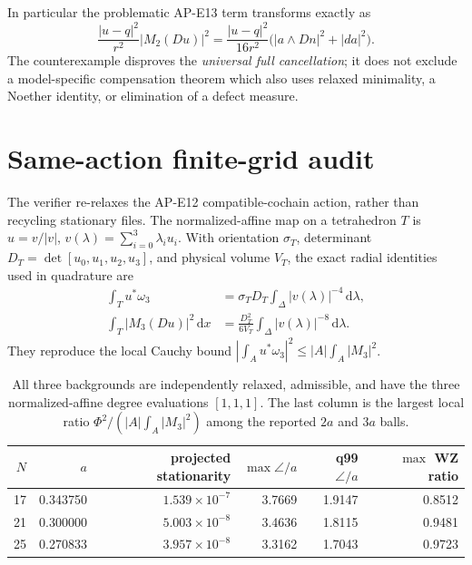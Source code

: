 \documentclass[11pt]{article}
\newcommand{\dd}{\,\mathrm d}
\begin{document}
In particular the problematic AP-E13 term transforms exactly as
\begin{equation}
 \frac{|u-q|^2}{r^2}|M_2(Du)|^2
 =\frac{|u-q|^2}{16r^2}
   \bigl(|a\wedge Dn|^2+|da|^2\bigr).                 \label{eq:remainder}
\end{equation}
The counterexample disproves the \emph{universal full cancellation}; it does
not exclude a model-specific compensation theorem which also uses relaxed
minimality, a Noether identity, or elimination of a defect measure.

\section{Same-action finite-grid audit}

The verifier re-relaxes the AP-E12 compatible-cochain action, rather than
recycling stationary files.  The normalized-affine map on a tetrahedron $T$
is $u=v/|v|$, $v(\lambda)=\sum_{i=0}^3\lambda_i u_i$.  With orientation
$\sigma_T$, determinant $D_T=\det[u_0,u_1,u_2,u_3]$, and physical volume
$V_T$, the exact radial identities used in quadrature are
\begin{align}
 \int_Tu^*\omega_3
 &=\sigma_TD_T\int_\Delta|v(\lambda)|^{-4}\dd\lambda, \label{eq:tetwz}\\
 \int_T|M_3(Du)|^2\dd x
 &=\frac{D_T^2}{6V_T}\int_\Delta|v(\lambda)|^{-8}\dd\lambda. \label{eq:tetm3}
\end{align}
They reproduce the local Cauchy bound
$|\int_Au^*\omega_3|^2\leq |A|\int_A|M_3|^2$.

\begin{table}[ht]
\centering
\small
\begin{tabular}{@{}rrrrrr@{}}
\toprule
$N$ & $a$ & projected stationarity & $\max\angle/a$ & q99 $\angle/a$
& $\max$ WZ ratio\\
\midrule
17 & 0.343750 & $1.539\times10^{-7}$ & 3.7669 & 1.9147 & 0.8512\\
21 & 0.300000 & $5.003\times10^{-8}$ & 3.4636 & 1.8115 & 0.9481\\
25 & 0.270833 & $3.957\times10^{-8}$ & 3.3162 & 1.7043 & 0.9723\\
\bottomrule
\end{tabular}
\caption{All three backgrounds are independently relaxed, admissible, and
have the three normalized-affine degree evaluations $[1,1,1]$.  The last
column is the largest local ratio $\Phi^2/(|A|\int_A|M_3|^2)$ among the
reported $2a$ and $3a$ balls.}
\label{tab:grid}
\end{table}
\end{document}
